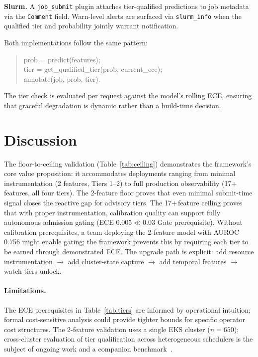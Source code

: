 \documentclass[sigconf]{acmart}
\begin{document}
\textbf{Slurm.} A \texttt{job\_submit} plugin attaches tier-qualified predictions to job metadata via the \texttt{Comment} field. Warn-level alerts are surfaced via \texttt{slurm\_info} when the qualified tier and probability jointly warrant notification.

Both implementations follow the same pattern:
\begin{quote}\small\ttfamily\raggedright
prob = predict(features);\\
tier = get\_qualified\_tier(prob, current\_ece);\\
annotate(job, prob, tier).
\end{quote}
The tier check is evaluated per request against the model's rolling ECE, ensuring that graceful degradation is dynamic rather than a build-time decision.

\section{Discussion}
The floor-to-ceiling validation (Table~\ref{tab:ceiling}) demonstrates the framework's core value proposition: it accommodates deployments ranging from minimal instrumentation (2 features, Tiers 1--2) to full production observability (17+ features, all four tiers). The 2-feature floor proves that even minimal submit-time signal closes the reactive gap for advisory tiers. The 17+\,feature ceiling proves that with proper instrumentation, calibration quality can support fully autonomous admission gating (ECE $0.005 \ll 0.03$ Gate prerequisite). Without calibration prerequisites, a team deploying the 2-feature model with AUROC 0.756 might enable gating; the framework prevents this by requiring each tier to be earned through demonstrated ECE. The upgrade path is explicit: add resource instrumentation $\to$ add cluster-state capture $\to$ add temporal features $\to$ watch tiers unlock.

\paragraph{Limitations.} The ECE prerequisites in Table~\ref{tab:tiers} are informed by operational intuition; formal cost-sensitive analysis could provide tighter bounds for specific operator cost structures. The 2-feature validation uses a single EKS cluster ($n=650$); cross-cluster evaluation of tier qualification across heterogeneous schedulers is the subject of ongoing work and a companion benchmark~\cite{espira2026benchmark}.
\end{document}
